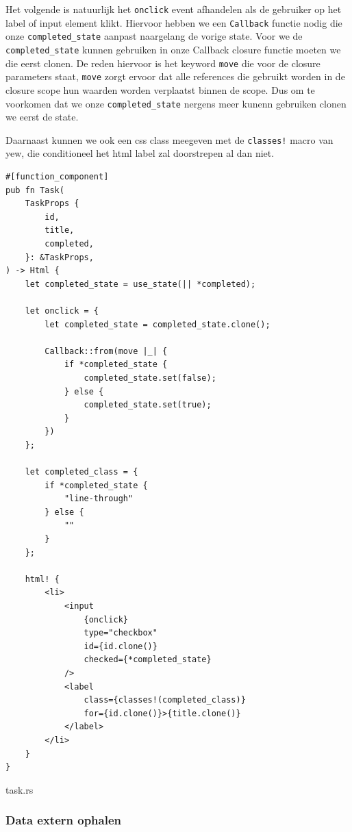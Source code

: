 Het volgende is natuurlijk het \texttt{onclick} event afhandelen als de gebruiker op het
label of input element klikt. Hiervoor hebben we een \texttt{Callback} functie nodig die
onze \texttt{completed_state} aanpast naargelang de vorige state. Voor we de
\texttt{completed_state} kunnen gebruiken in onze Callback closure functie moeten we die
eerst clonen. De reden hiervoor is het keyword \texttt{move} die voor de closure
parameters staat, \texttt{move} zorgt
ervoor dat alle references die gebruikt worden in de closure scope hun waarden worden verplaatst
binnen de scope. Dus om te voorkomen dat we onze \texttt{completed_state} nergens meer
kunenn gebruiken clonen we eerst de state.

Daarnaast kunnen we ook een css class meegeven met de \texttt{classes!} macro van yew, die
conditioneel het html label zal doorstrepen al dan niet.

\clearpage

\begin{listing}
\begin{verbatim}
#[function_component]
pub fn Task(
    TaskProps {
        id,
        title,
        completed,
    }: &TaskProps,
) -> Html {
    let completed_state = use_state(|| *completed);

    let onclick = {
        let completed_state = completed_state.clone();

        Callback::from(move |_| {
            if *completed_state {
                completed_state.set(false);
            } else {
                completed_state.set(true);
            }
        })
    };

    let completed_class = {
        if *completed_state {
            "line-through"
        } else {
            ""
        }
    };

    html! {
        <li>
            <input
                {onclick}
                type="checkbox"
                id={id.clone()}
                checked={*completed_state}
            />
            <label
                class={classes!(completed_class)}
                for={id.clone()}>{title.clone()}
            </label>
        </li>
    }
}
\end{verbatim}
\caption{task.rs}
\end{listing}

\clearpage

\subsubsection{Data extern ophalen}


